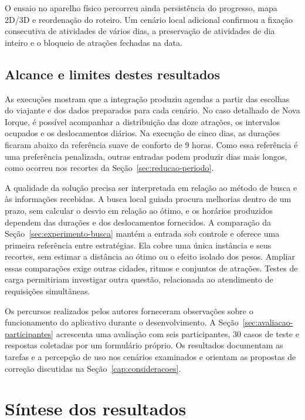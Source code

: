 O ensaio no aparelho físico percorreu ainda persistência do progresso, mapa 2D/3D e reordenação do roteiro. Um cenário local adicional confirmou a fixação consecutiva de atividades de vários dias, a preservação de atividades de dia inteiro e o bloqueio de atrações fechadas na data.

\subsection{Alcance e limites destes resultados}
\label{sec:alcance-resultados}

As execuções mostram que a integração produziu agendas a partir das escolhas do viajante e dos dados preparados para cada cenário. No caso detalhado de Nova Iorque, é possível acompanhar a distribuição das doze atrações, os intervalos ocupados e os deslocamentos diários. Na execução de cinco dias, as durações ficaram abaixo da referência suave de conforto de 9 horas. Como essa referência é uma preferência penalizada, outras entradas podem produzir dias mais longos, como ocorreu nos recortes da Seção~\ref{sec:reducao-periodo}.

A qualidade da solução precisa ser interpretada em relação ao método de busca e às informações recebidas. A busca local guiada procura melhorias dentro de um prazo, sem calcular o desvio em relação ao ótimo, e os horários produzidos dependem das durações e dos deslocamentos fornecidos. A comparação da Seção~\ref{sec:experimento-busca} mantém a entrada sob controle e oferece uma primeira referência entre estratégias. Ela cobre uma única instância e seus recortes, sem estimar a distância ao ótimo ou o efeito isolado dos pesos. Ampliar essas comparações exige outras cidades, ritmos e conjuntos de atrações. Testes de carga permitiriam investigar outra questão, relacionada ao atendimento de requisições simultâneas.

Os percursos realizados pelos autores forneceram observações sobre o funcionamento do aplicativo durante o desenvolvimento. A Seção~\ref{sec:avaliacao-participantes} acrescenta uma avaliação com seis participantes, 30 casos de teste e respostas coletadas por um formulário próprio. Os resultados documentam as tarefas e a percepção de uso nos cenários examinados e orientam as propostas de correção discutidas na Seção~\ref{cap:consideracoes}.





\section{Síntese dos resultados}

